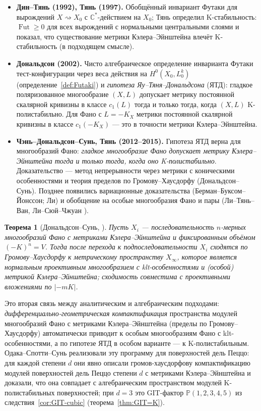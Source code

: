 \documentclass[11pt,a4paper]{article}
\theoremstyle{plain}
\newtheorem{theorem}{Теорема}[section]
\theoremstyle{definition}
\theoremstyle{remark}
\renewcommand{\C}{\mathbb{C}}
\newcommand{\PP}{\mathbb{P}}
\DeclareMathOperator{\Fut}{Fut}
\begin{document}
\begin{itemize}
\item \textbf{Дин--Тянь (1992), Тянь (1997).} Обобщённый инвариант Футаки для вырождений
$X\rightsquigarrow X_0$ с $\C^*$-действием на $X_0$; Тянь определил K-стабильность: $\Fut\ge0$ для
всех вырождений с нормальными центральными слоями и показал, что существование метрики Кэлера--Эйнштейна влечёт
K-стабильность (в подходящем смысле).
\item \textbf{Дональдсон (2002).} Чисто алгебраическое определение инварианта Футаки
тест-конфигурации через веса действия на $H^0(X_0,L_0^k)$ (определение~\ref{def:Futaki}) и
\emph{гипотеза Яу--Тяня--Дональдсона} (ЯТД): гладкое поляризованное многообразие $(X,L)$ допускает
метрику постоянной скалярной кривизны в классе $c_1(L)$ тогда и только тогда, когда $(X,L)$
K-полистабильно. Для Фано с $L=-K_X$ метрики постоянной скалярной кривизны в классе $c_1(-K_X)$ ---
это в точности метрики Кэлера--Эйнштейна.
\item \textbf{Чэнь--Дональдсон--Сунь, Тянь (2012--2015).} Гипотеза ЯТД верна для многообразий Фано:
\emph{гладкое многообразие Фано допускает метрику Кэлера--Эйнштейна тогда и только тогда, когда оно K-полистабильно}.
Доказательство --- метод непрерывности через метрики с коническими особенностями и теория
пределов по Громову--Хаусдорфу (Дональдсон--Сунь). Позднее появились вариационные доказательства
(Берман--Буксом--Йонссон; Ли) и обобщение на особые многообразия Фано и пары
(Ли--Тянь--Ван, Ли--Сюй--Чжуан \cite{LXZ}).
\end{itemize}

\begin{theorem}[Дональдсон--Сунь, \cite{DS14}]\label{thm:DS}
Пусть $X_i$ --- последовательность $n$-мерных многообразий Фано с метриками Кэлера--Эйнштейна и фиксированным объёмом
$(-K)^n=V$. Тогда после перехода к подпоследовательности $X_i$ сходятся по Громову--Хаусдорфу к
метрическому пространству $X_\infty$, которое является нормальным проективным многообразием с
klt-особенностями и \textup{(}особой\textup{)} метрикой Кэлера--Эйнштейна; сходимость совместима с проективными вложениями по $|-mK|$.
\end{theorem}

Это вторая связь между аналитическим и алгебраическим подходами: \emph{дифференциально-геометрическая компактификация} пространства модулей
многообразий Фано с метриками Кэлера--Эйнштейна (пределы по Громову--Хаусдорфу) автоматически приводит к особым многообразиям
Фано с klt-особенностями, а по гипотезе ЯТД в особом варианте --- к K-полистабильным. Одака--Спотти--Сунь
\cite{OSS} реализовали эту программу для поверхностей дель Пеццо: для каждой степени $d$ они явно
описали громов-хаусдорфову компактификацию модулей поверхностей дель Пеццо степени $d$ с метриками Кэлера--Эйнштейна и доказали, что она
совпадает с алгебраическим пространством модулей K-полистабильных поверхностей; при $d=3$ это
GIT-фактор $\PP(1,2,3,4,5)$ из следствия~\ref{cor:GIT-cubic} (теорема~\ref{thm:GIT=K}).
\end{document}
